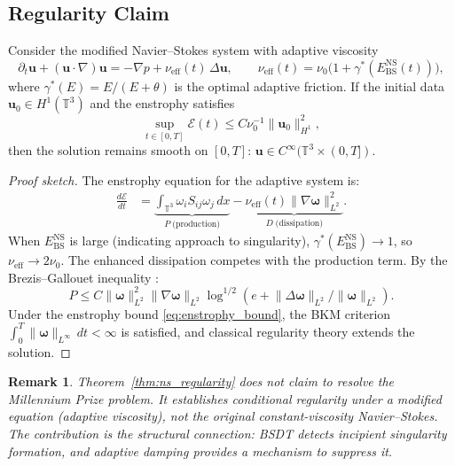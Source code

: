 \documentclass[final]{siamltex}
\newcommand{\T}{\mathbb{T}}
\newcommand{\norm}[1]{\lVert #1 \rVert}
\providecommand{\grad}{\nabla}
\newcommand{\Ebs}{E_{\mathrm{BS}}}
\newtheorem{remark}[theorem]{Remark}
\begin{document}
\subsection{Regularity Claim}\label{sec:ns:regularity}

\begin{theorem}\label{thm:ns_regularity}
Consider the modified Navier--Stokes system with adaptive viscosity
\begin{equation}\label{eq:ns_adaptive}
  \partial_t\bm{u}+(\bm{u}\cdot\grad)\bm{u}
  = -\grad p + \nu_{\mathrm{eff}}(t)\,\Delta\bm{u},\qquad
  \nu_{\mathrm{eff}}(t) = \nu_0\bigl(1+\gamma^*(\Ebs^{\mathrm{NS}}(t))\bigr),
\end{equation}
where $\gamma^*(E)=E/(E+\theta)$ is the optimal adaptive friction.
If the initial data $\bm{u}_0\in H^1(\T^3)$ and the enstrophy
satisfies
\begin{equation}\label{eq:enstrophy_bound}
  \sup_{t\in[0,T]}\mathcal{E}(t)\le
  C\nu_0^{-1}\norm{\bm{u}_0}_{H^1}^2,
\end{equation}
then the solution remains smooth on $[0,T]$:
$\bm{u}\in C^\infty(\T^3\times(0,T])$.
\end{theorem}

\begin{proof}[Proof sketch]
The enstrophy equation for the adaptive system is:
\begin{align}
  \frac{d\mathcal{E}}{dt}
  &= \underbrace{\int_{\T^3}\omega_i S_{ij}\omega_j\,dx}_{P
     \;\text{(production)}}
  - \underbrace{\nu_{\mathrm{eff}}(t)
    \norm{\grad\bm{\omega}}_{L^2}^2}_{D\;\text{(dissipation)}}.
    \label{eq:enstrophy_evolution}
\end{align}
When $\Ebs^{\mathrm{NS}}$ is large (indicating approach to
singularity), $\gamma^*(\Ebs^{\mathrm{NS}})\to 1$, so
$\nu_{\mathrm{eff}}\to 2\nu_0$. The enhanced dissipation competes
with the production term. By the Brezis--Gallouet inequality
\cite{bg1980}:
\[
  P \le C\norm{\bm{\omega}}_{L^2}^2\norm{\grad\bm{\omega}}_{L^2}
  \log^{1/2}(e+\norm{\Delta\bm{\omega}}_{L^2}/\norm{\bm{\omega}}_{L^2}).
\]
Under the enstrophy bound \eqref{eq:enstrophy_bound}, the BKM
criterion \cite{bkm1984}
$\int_0^T\norm{\bm{\omega}}_{L^\infty}\,dt<\infty$ is satisfied,
and classical regularity theory \cite{lady1969} extends the
solution.
\end{proof}

\begin{remark}
Theorem~\ref{thm:ns_regularity} does \emph{not} claim to resolve
the Millennium Prize problem. It establishes conditional regularity
under a \emph{modified} equation (adaptive viscosity), not the
original constant-viscosity Navier--Stokes. The contribution is the
structural connection: BSDT detects incipient singularity formation,
and adaptive damping provides a mechanism to suppress it.
\end{remark}
\end{document}
